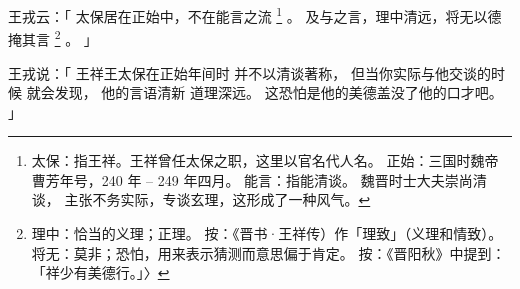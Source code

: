 
\switchcolumn*[\section{}]

王戎云：「
    太保居在正始中，不在能言之流%
    \footnote{%
        太保：指王祥。王祥曾任太保之职，这里以官名代人名。
        正始：三国时魏帝曹芳年号，240 年 -- 249 年四月。
        能言：指能清谈。
              魏晋时士大夫崇尚清谈，
              主张不务实际，专谈玄理，这形成了一种风气。
    }%
    。
    及与之言，理中清远，将无以德掩其言%
    \footnote{%
        理中：恰当的义理；正理。
        按：《晋书·王祥传）作「理致」（义理和情致）。
        将无：莫非；恐怕，用来表示猜测而意思偏于肯定。
        按：《晋阳秋》中提到：「祥少有美德行。」〉
    }%
    。
」

\switchcolumn

王戎说：「
    王祥王太保在正始年间时
    并不以清谈著称，
    但当你实际与他交谈的时候
    就会发现，
    他的言语清新
        道理深远。
    这恐怕是他的美德盖没了他的口才吧。
」
